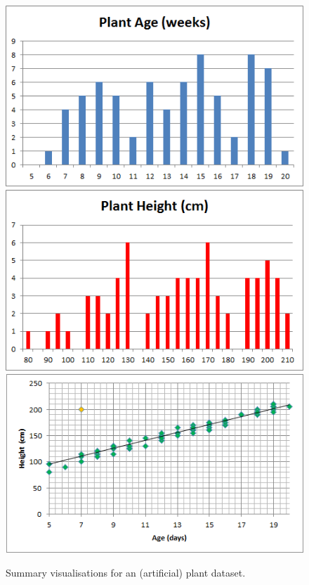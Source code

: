 \begin{figure}[t]
       \centering
 \includegraphics[width=\textwidth]{Images/plant_age}
 \includegraphics[width=\textwidth]{Images/plant_height}
 \includegraphics[width=\textwidth]{Images/plant_height_vs_age}
        \caption[\small Summary visualisations for a plant dataset]{\small Summary visualisations for an (artificial) plant dataset.}
        \label{fig:plant_data}
\end{figure}
